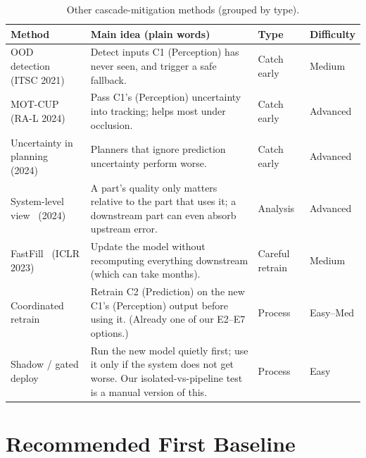 \documentclass[11pt,a4paper]{article}
\begin{document}
\begin{table}[t!]
\centering
\caption{Other cascade-mitigation methods (grouped by type).}
\label{tab:cascade_extra}
\small
\renewcommand{\arraystretch}{1.3}
\begin{tabular}{@{}L{2.9cm}L{6.3cm}L{2.0cm}L{2.0cm}@{}}
\toprule
\textbf{Method} & \textbf{Main idea (plain words)} & \textbf{Type} & \textbf{Difficulty} \\
\midrule
OOD detection~\cite{nitsch2021ood} (ITSC 2021) &
Detect inputs C1 (Perception) has never seen, and trigger a safe fallback. &
Catch early & Medium \\
MOT-CUP~\cite{su2024motcup} (RA-L 2024) &
Pass C1's (Perception) uncertainty into tracking; helps most under occlusion. &
Catch early & Advanced \\
Uncertainty in planning~\cite{shao2024uncertainty} (2024) &
Planners that ignore prediction uncertainty perform worse. &
Catch early & Advanced \\
System-level view~\cite{deglurkar2024systemlevel} (2024) &
A part's quality only matters relative to the part that uses it; a
downstream part can even absorb upstream error. &
Analysis & Advanced \\
FastFill~\cite{jaeckle2023fastfill} (ICLR 2023) &
Update the model without recomputing everything downstream (which can
take months). &
Careful retrain & Medium \\
Coordinated retrain~\cite{sculley2015hidden} &
Retrain C2 (Prediction) on the new C1's (Perception) output before using
it. (Already one of our E2--E7 options.) &
Process & Easy--Med \\
Shadow / gated deploy~\cite{breck2019data} &
Run the new model quietly first; use it only if the system does not get
worse. Our isolated-vs-pipeline test is a manual version of this. &
Process & Easy \\
\bottomrule
\end{tabular}
\end{table}


\pagebreak
\section{Recommended First Baseline}
\end{document}
